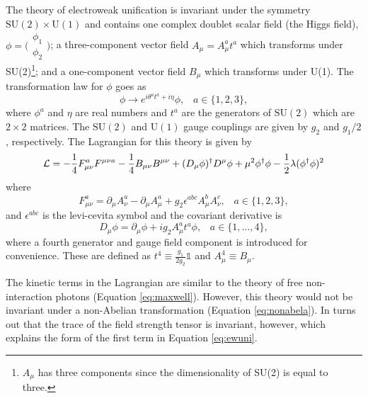 The theory of electroweak unification is invariant under the symmetry $\text{SU}(2)\times\text{U}(1)$ and contains one complex doublet scalar field (the Higgs field), $\phi=\big(\begin{smallmatrix}
    \phi_1\\
    \phi_2
\end{smallmatrix}\big)$; a three-component vector field $A_\mu=A_\mu^at^a$ which transforms under SU(2)\footnote{$A_\mu$ has three components since the dimensionality of SU(2) is equal to three.}; and a one-component vector field $B_\mu$ which transforms under U(1). The transformation law for $\phi$ goes as
\begin{equation}
    \phi\rightarrow e^{i\theta^at^a+i\eta}\phi,\hspace{10pt}a\in\{1,2,3\},
\end{equation}
where $\phi^a$ and $\eta$ are real numbers and $t^a$ are the generators of $\text{SU}(2)$ which are $2\times2$ matrices. The $\text{SU}(2)$ and $\text{U}(1)$ gauge couplings are given by $g_2$ and $g_1/2$, respectively. The Lagrangian for this theory is given by
\begin{equation}\label{eq:ewuni}
   \mathcal{L}=-\frac{1}{4}F^a_{\mu\nu}F^{\mu\nu a}-\frac{1}{4}B_{\mu\nu}B^{\mu\nu}+(D_\mu\phi)^\dagger D^\mu\phi+\mu^2\phi^\dagger\phi-\frac{1}{2}\lambda(\phi^\dagger\phi)^2 
\end{equation}
where 
\begin{equation}
    F^a_{\mu\nu}=\partial_\mu A^a_\nu-\partial_\mu A_\mu^a+g_2\epsilon^{abc}A_\mu^bA_\nu^c,\hspace{10pt}a\in\{1,2,3\},
\end{equation}
and $\epsilon^{abc}$ is the levi-cevita symbol and the covariant derivative is
\begin{equation}
    D_\mu\phi=\partial_\mu\phi+ig_2A_\mu^at^a\phi,\hspace{10pt}a\in\{1,\dots,4\},
\end{equation}
where a fourth generator and gauge field component is introduced for convenience. These are defined as $t^4\equiv\frac{g_1}{2g_2}\mathds{1}$ and $A^4_\mu\equiv B_\mu$.

The kinetic terms in the Lagrangian are similar to the theory of free non-interaction photons (Equation \ref{eq:maxwell}). However, this theory would not be invariant under a non-Abelian transformation (Equation \ref{eq:nonabela}). In turns out that the trace of the field strength tensor is invariant, however, which explains the form of the first term in Equation \ref{eq:ewuni}.

